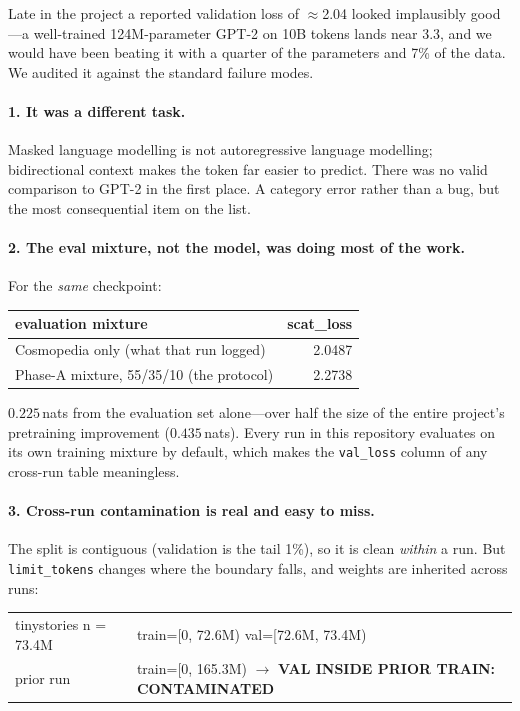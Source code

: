 \documentclass[11pt,a4paper]{article}
\newcommand{\nats}[1]{\ensuremath{#1}\,nats}
\begin{document}
Late in the project a reported validation loss of $\approx$2.04 looked implausibly good---a
well-trained 124M-parameter GPT-2 on 10B tokens lands near 3.3, and we would have been beating
it with a quarter of the parameters and 7\% of the data. We audited it against the standard
failure modes.

\paragraph{1. It was a different task.} Masked language modelling is not autoregressive language
modelling; bidirectional context makes the token far easier to predict. There was no valid
comparison to GPT-2 in the first place. A category error rather than a bug, but the most
consequential item on the list.

\paragraph{2. The eval mixture, not the model, was doing most of the work.} For the \emph{same}
checkpoint:

\begin{center}\small
\begin{tabular}{lr}
\toprule
evaluation mixture & scat\_loss \\
\midrule
Cosmopedia only (what that run logged)   & 2.0487 \\
Phase-A mixture, 55/35/10 (the protocol) & 2.2738 \\
\bottomrule
\end{tabular}
\end{center}

\nats{0.225} from the evaluation set alone---over half the size of the entire project's
pretraining improvement (\nats{0.435}). Every run in this repository evaluates on its own
training mixture by default, which makes the \texttt{val\_loss} column of any cross-run table
meaningless.

\paragraph{3. Cross-run contamination is real and easy to miss.} The split is contiguous
(validation is the tail 1\%), so it is clean \emph{within} a run. But \texttt{limit\_tokens}
changes where the boundary falls, and weights are inherited across runs:

\begin{center}\small\ttfamily
\begin{tabular}{ll}
tinystories \quad n = 73.4M & train=[0, 72.6M) \quad val=[72.6M, 73.4M) \\
\quad prior run & train=[0, 165.3M) $\to$ \textbf{VAL INSIDE PRIOR TRAIN: CONTAMINATED} \\
\end{tabular}
\end{center}
\end{document}
